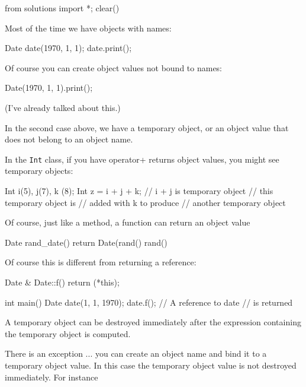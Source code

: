 \begin{python0}
from solutions import *; clear()
\end{python0}

Most of the time we have objects with names:

\begin{consolethree}[escapeinside=||]
Date date(1970, 1, 1);
date.print();
\end{consolethree}

Of course you can create object values not bound to names:

\begin{consolethree}[escapeinside=||]
Date(1970, 1, 1).print();
\end{consolethree}

(I've already talked about this.)

In the second case above, we have a temporary object, or an object value
that does not belong to an object name.

In the \texttt{Int} class, if you have operator+ returns object values,
you might see temporary objects:

\begin{consolethree}[escapeinside=||]
Int i(5), j(7), k (8);
Int z = i + j + k; // i + j is temporary object
                   // this temporary object is
                   // added with k to produce
                   // another temporary object
\end{consolethree}

Of course, just like a method, a function can return an object value

\begin{consolethree}[escapeinside=||]
Date rand_date()
{
    return Date(rand()%
                rand()%
}
\end{consolethree}

Of course this is different from returning a reference:

\begin{consolethree}[escapeinside=||]
Date & Date::f()
{
    return (*this);
}

int main()
{
    Date date(1, 1, 1970);
    date.f(); // A reference to date
              // is returned
}
\end{consolethree}

A temporary object can be destroyed immediately after the expression
containing the temporary object is computed.

There is an exception ... you can create an object name and bind it
to a temporary object value. In this case the temporary object value is
not destroyed immediately. For instance

